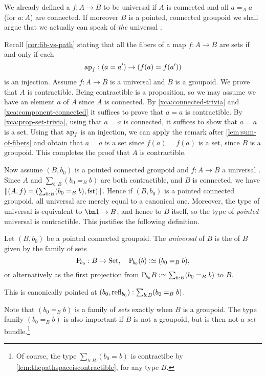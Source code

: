 We already defined a \covering $f:A\to B$ to be universal if $A$ is connected
and all $a=_A a$ (for $a:A$) are connected.
If moreover $B$ is a pointed, connected groupoid we shall argue that
we actually can speak of \emph{the} universal \covering.

Recall \cref{cor:fib-vs-path} stating that all the fibers of a map $f:A\to B$
are sets if and only if each
\[
\ap{f}: (a=a')\to (f(a)=f(a'))
\]
is an injection.
Assume $f:A\to B$ is a universal \covering and $B$ is a groupoid.
We prove that $A$ is contractible.
Being contractible is a proposition, so we may assume
we have an element $a$ of $A$ since $A$ is connected.
By \cref{xca:connected-trivia} and \ref{xca:component-connected}
it suffices to prove that $a=a$ is contractible.
By \cref{xca:prop-set-trivia}, using that $a=a$ is connected,
it suffices to show that $a=a$ is a set.
Using that $\ap{f}$ is an injection, we can apply the remark after
\cref{lem:sum-of-fibers} and obtain that $a=a$ is a set since
$f(a)=f(a)$ is a set, since $B$ is a groupoid.
This completes the proof that $A$ is contractible.

Now assume $(B,b_0)$ is a pointed connected groupoid and $f:A\to B$
a universal \covering. Since $A$ and $\sum_{b:B}(b_0=_Bb)$ are both
contractible, and $B$ is connected, we have
$\Trunc{(A,f)=(\sum_{b:B}(b_0=_Bb),\fst)}$.
Hence if $(B,b_0)$ is a pointed connected groupoid, all
universal \coverings are merely equal to a canonical one.
Moreover, the type of universal \coverings is equivalent to
$\bn 1 \to B$, and hence to $B$ itself,
so the type of \emph{pointed} universal \coverings is contractible.
This justifies the following definition.
\begin{definition}
  \label{def:universalcover}
  Let $(B,b_0)$ be a pointed connected groupoid.
  The \emph{universal \covering} of $B$
  is the \covering of $B$ given by the family of sets
  \[
    \uc{b_0}:B\to\Set,\quad \uc{b_0}(b)\defequi (b_0=_Bb),
  \]
  or alternatively as the first projection from
  $\uc{b_0}B\defequi\sum_{b:B}(b_0=_Bb)$ to $B$.

  This is canonically pointed at $(b_0,\mathrm{refl}_{b_0}) : \sum_{b:B}(b_0=_Bb)$.
\end{definition}
Note that $(b_0=_B b)$ is a family of \emph{sets} exactly when $B$ is a groupoid.
The type family $(b_0=_B b)$ is also important if $B$ is not a groupoid,
but is then not a \emph{set} bundle.\footnote{%
  Of course, the type $\sum_{b:B}(b_0=b)$ is contractibe
  by \cref{lem:thepathspaceiscontractible}, for any type $B$.}

